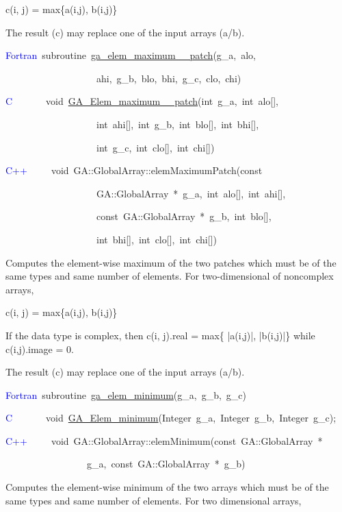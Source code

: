 c(i, j) = max\{a(i,j), b(i,j)\}

The result (c) may replace one of the input arrays (a/b). 
\begin{lyxcode}
\textcolor{blue}{Fortran}~subroutine~\href{http://www.emsl.pnl.gov/docs/global/ga_ops.html\#ga_elem_maximum_patch}{ga\_{}elem\_{}maximum\_{}\_{}patch}(g\_a,~alo,

~~~~~~~~~~~~~~~~~~~ahi,~g\_b,~blo,~bhi,~g\_c,~clo,~chi)~

\textcolor{blue}{C}~~~~~~~void~\href{http://www.emsl.pnl.gov/docs/global/c_nga_ops.html\#ga_elem_maximum_patch}{GA\_{}Elem\_{}maximum\_{}\_{}patch}(int~g\_a,~int~alo{[}{]},

~~~~~~~~~~~~~~~~~~~int~ahi{[}{]},~int~g\_b,~int~blo{[}{]},~int~bhi{[}{]},~

~~~~~~~~~~~~~~~~~~~int~g\_c,~int~clo{[}{]},~int~chi{[}{]})

\textcolor{blue}{C++}~~~~~void~GA::GlobalArray::elemMaximumPatch(const~

~~~~~~~~~~~~~~~~~~~GA::GlobalArray~{*}~g\_a,~int~alo{[}{]},~int~ahi{[}{]},~

~~~~~~~~~~~~~~~~~~~const~GA::GlobalArray~{*}~g\_b,~int~blo{[}{]},~

~~~~~~~~~~~~~~~~~~~int~bhi{[}{]},~int~clo{[}{]},~int~chi{[}{]})
\end{lyxcode}
Computes the element-wise maximum of the two patches which must be
of the same types and same number of elements. For two-dimensional
of noncomplex arrays,

c(i, j) = max\{a(i,j), b(i,j)\}

If the data type is complex, then c(i, j).real = max\{ |a(i,j)|, |b(i,j)|\}
while c(i,j).image = 0.

The result (c) may replace one of the input arrays (a/b). 
\begin{lyxcode}
\textcolor{blue}{Fortran}~subroutine~\href{http://www.emsl.pnl.gov/docs/global/ga_ops.html\#ga_elem_minimum}{ga\_{}elem\_{}minimum}(g\_a,~g\_b,~g\_c)~

\textcolor{blue}{C}~~~~~~~void~\href{http://www.emsl.pnl.gov/docs/global/c_nga_ops.html\#ga_elem_minimum}{GA\_{}Elem\_{}minimum}(Integer~g\_a,~Integer~g\_b,~Integer~g\_c);

\textcolor{blue}{C++~}~~~~void~GA::GlobalArray::elemMinimum(const~GA::GlobalArray~{*}

~~~~~~~~~~~~~~~~~g\_a,~const~GA::GlobalArray~{*}~g\_b)
\end{lyxcode}
Computes the element-wise minimum of the two arrays which must be
of the same types and same number of elements. For two dimensional
arrays,


